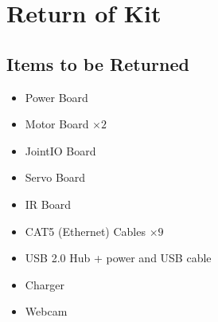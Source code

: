 \section {Return of Kit}
\label{sec:kit-return}

\subsection {Items to be Returned}

\begin{itemize}
\item Power Board
\item Motor Board $\times 2$
\item JointIO Board
\item Servo Board
\item IR Board
\item CAT5 (Ethernet) Cables $\times 9$
\item USB 2.0 Hub + power and USB cable
\item Charger
\item Webcam
\end{itemize}
